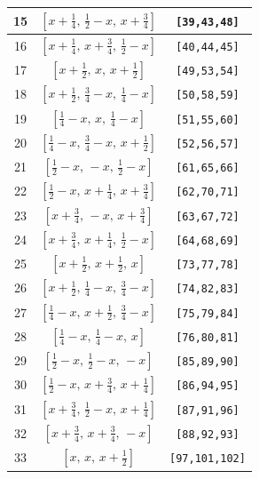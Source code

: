 \documentclass[fleqn,8pt]{jsarticle}
\begin{document}
\begin{longtable}{ccc}
15 & $\left[ x + \frac{1}{4},\, \frac{1}{2} - x,\, x + \frac{3}{4} \right]$ & {\tt [39,43,48]} \\ \hline
16 & $\left[ x + \frac{1}{4},\, x + \frac{3}{4},\, \frac{1}{2} - x \right]$ & {\tt [40,44,45]} \\ \hline
17 & $\left[ x + \frac{1}{2},\, x,\, x + \frac{1}{2} \right]$ & {\tt [49,53,54]} \\ \hline
18 & $\left[ x + \frac{1}{2},\, \frac{3}{4} - x,\, \frac{1}{4} - x \right]$ & {\tt [50,58,59]} \\ \hline
19 & $\left[ \frac{1}{4} - x,\, x,\, \frac{1}{4} - x \right]$ & {\tt [51,55,60]} \\ \hline
20 & $\left[ \frac{1}{4} - x,\, \frac{3}{4} - x,\, x + \frac{1}{2} \right]$ & {\tt [52,56,57]} \\ \hline
21 & $\left[ \frac{1}{2} - x,\, - x,\, \frac{1}{2} - x \right]$ & {\tt [61,65,66]} \\ \hline
22 & $\left[ \frac{1}{2} - x,\, x + \frac{1}{4},\, x + \frac{3}{4} \right]$ & {\tt [62,70,71]} \\ \hline
23 & $\left[ x + \frac{3}{4},\, - x,\, x + \frac{3}{4} \right]$ & {\tt [63,67,72]} \\ \hline
24 & $\left[ x + \frac{3}{4},\, x + \frac{1}{4},\, \frac{1}{2} - x \right]$ & {\tt [64,68,69]} \\ \hline
25 & $\left[ x + \frac{1}{2},\, x + \frac{1}{2},\, x \right]$ & {\tt [73,77,78]} \\ \hline
26 & $\left[ x + \frac{1}{2},\, \frac{1}{4} - x,\, \frac{3}{4} - x \right]$ & {\tt [74,82,83]} \\ \hline
27 & $\left[ \frac{1}{4} - x,\, x + \frac{1}{2},\, \frac{3}{4} - x \right]$ & {\tt [75,79,84]} \\ \hline
28 & $\left[ \frac{1}{4} - x,\, \frac{1}{4} - x,\, x \right]$ & {\tt [76,80,81]} \\ \hline
29 & $\left[ \frac{1}{2} - x,\, \frac{1}{2} - x,\, - x \right]$ & {\tt [85,89,90]} \\ \hline
30 & $\left[ \frac{1}{2} - x,\, x + \frac{3}{4},\, x + \frac{1}{4} \right]$ & {\tt [86,94,95]} \\ \hline
31 & $\left[ x + \frac{3}{4},\, \frac{1}{2} - x,\, x + \frac{1}{4} \right]$ & {\tt [87,91,96]} \\ \hline
32 & $\left[ x + \frac{3}{4},\, x + \frac{3}{4},\, - x \right]$ & {\tt [88,92,93]} \\ \hline
33 & $\left[ x,\, x,\, x + \frac{1}{2} \right]$ & {\tt [97,101,102]} \\ \hline

\end{longtable}
\end{document}
